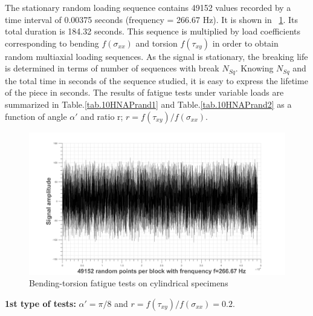\documentclass[3p,times,number,review]{elsarticle}
\newcommand{\figref}[1]{\figurename~\ref{#1}}
\begin{document}
The stationary random loading sequence contains 49152 values recorded by a time interval of 0.00375 seconds (frequency = 266.67 Hz). It is shown in \figref{fig.10HNAPrandom}. Its total duration is 184.32 seconds. This sequence is multiplied by load coefficients corresponding to bending $f (\sigma_{xx})$ and torsion $f (\tau_{xy})$ in order to obtain random multiaxial loading sequences. As the signal is stationary, the breaking life is determined in terms of number of sequences with break $N_{Sq}$. Knowing $N_{Sq}$ and the total time in seconds of the sequence studied, it is easy to express the lifetime of the piece in seconds. The results of fatigue tests under variable loads are summarized in Table.\ref{tab.10HNAPrand1} and Table.\ref{tab.10HNAPrand2} as a function of angle $\alpha'$ and ratio r; $r =f(\tau_{xy})/f(\sigma_{xx})$.
\begin{figure}[!h]
\centering
\includegraphics[width=\textwidth]{figures//10HNAPrandomblock.png} 
\caption{Bending-torsion fatigue tests on cylindrical specimens\cite{carpinteri2003multiaxial}}
\label{fig.10HNAPrandom}
\end{figure}

\textbf{1st type of tests:} $\alpha' = \pi / 8$ and $r =f(\tau_{xy})/f(\sigma_{xx})=0.2$.
\end{document}
